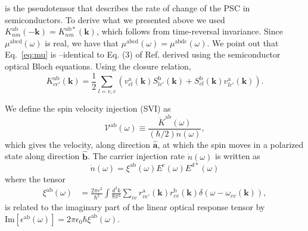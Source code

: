 \documentclass[floatfix,prb,aps,superscriptaddress,showpacs,11pt,preprint,letterpaper]{revtex4}
\begin{document}
is the pseudotensor that describes the rate of change of the PSC in
semiconductors. To derive what we presented above we used $
K^{\mathrm{ab}}_{nm}(-\mathbf{k}) = K^{\mathrm{ab*}}_{nm}({\mathbf k})$, which
follows from time-reversal invariance. Since $\mu^{\mathrm{abcd}}(\omega)$ is
real, we have that $\mu^{\mathrm{abcd}}(\omega) =
\mu^{\mathrm{abdc}} (\omega)$. We point out that Eq.~\eqref{eq:mu} is
–identical to Eq. (3) of Ref.  derived using the
semiconductor optical Bloch equations. Using the closure relation,
\begin{equation}
K^{\mathrm{ab}}_{cc'}({\mathbf k}) = \frac{1}{2}
\sum_{l=v,c}
\left(v^{\mathrm{a}}_{cl}({\mathbf k})S^{\mathrm{b}}_{lc'}({\mathbf k})
+S^{\mathrm{b}}_{cl}({\mathbf k}) v^{\mathrm{a}}_{lc'}({\mathbf k})
\right)
.
\label{eq:velspimatelem}
\end{equation}

We define the spin velocity injection (SVI) as
\begin{equation}\label{eq:vab-w}
\mathcal{V}^{\mathrm{ab}}(\omega) \equiv
\frac{\dot{K}^{\mathrm{ab}}(\omega)}{(\hbar/2) \dot{n}(\omega)},
\end{equation}  
which gives the velocity, along direction $\hat{\mathbf{a}}$, at which the spin moves in a
polarized state along direction $\hat{\mathbf{b}}$. 
The carrier injection rate $\dot n(\omega)$ is written as\cite{nastosPRB07}
\begin{equation}
\dot{n}(\omega) =
\xi^{\mathrm{ab}}(\omega) E^{c }(\omega) E^{d*}(\omega)
\label{eq:dotn}
\end{equation}
where the tensor 
\begin{equation}\label{eq:xi}
\begin{aligned}
\xi^{\mathrm{ab}}(\omega)
&
=
\frac{2\pi e^{2}}{\hbar^{2}} \int 
\frac{d^{3}k}{8 \pi^{3}}
 \sum_{vc}
r^{\mathrm{a}}_{vc'}({\mathbf k})  
r^{\mathrm{b}}_{cv }({\mathbf k})  
\delta(\omega-\omega_{cv}({\mathbf k})), 
\end{aligned}
\end{equation}
is related to the imaginary part of the linear optical response tensor by
$\mathrm{Im} [\epsilon^{\mathrm{a}\mathrm{b}}(\omega)] =
2\pi\epsilon_0\hbar\xi^{\mathrm{a}\mathrm{b}}(\omega)$.
\end{document}
